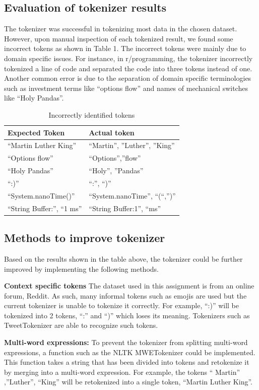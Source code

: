 \documentclass[sigconf,nonacm=true]{acmart}
\begin{document}
\subsection{Evaluation of tokenizer results}
The tokenizer was successful in tokenizing most data in the chosen dataset. However, upon manual inspection of each tokenized result, we found some incorrect tokens as shown in Table 1. The incorrect tokens were mainly due to domain specific issues. For instance, in r/programming, the tokenizer incorrectly tokenized a line of code and separated the code into three tokens instead of one. Another common error is due to the separation of domain specific terminologies such as investment terms like “options flow” and names of mechanical switches like “Holy Pandas”.

\begin{table}[h]
\begin{tabular}{|l|l|}
\hline
 {\bf Expected Token} &  {\bf Actual token} \\ \hline
 “Martin Luther King”& “Martin”, ”Luther”, ”King”  \\ \hline
 “Options flow” &  “Options”,”flow” \\ \hline
 “Holy Pandas”& “Holy”, ”Pandas” \\ \hline
“:)” &  “:”, “)”\\ \hline
 “System.nanoTime()”& “System.nanoTime”, “(“,”)” \\ \hline
“String Buffer:”, “1 ms”  &  “String Buffer:1”, “ms”\\ \hline
\end{tabular}
\caption{\label{tab:Table 1:}Incorrectly identified tokens}
\end{table}


\subsection{Methods to improve tokenizer}
Based on the results shown in the table above, the tokenizer could be further improved by implementing the following methods. \medskip


{\bf Context specific tokens}
The dataset used in this assignment is from an online forum, Reddit. As such, many informal tokens such as emojis are used but the current tokenizer is unable to tokenize it correctly. For example, “:)” will be tokenized into 2 tokens, “:” and “)” which loses its meaning. Tokenizers such as TweetTokenizer are able to recognize such tokens.\bigskip

 {\bf Multi-word expressions:}
To prevent the tokenizer from splitting multi-word expressions, a function such as the NLTK MWETokenizer could be implemented. This function takes a string that has been divided into tokens and re\-tokenize it by merging into a multi-word expression. For example, the tokens “ Martin” ,”Luther”, “King” will be re\-tokenized into a single token, “Martin Luther King”. \smallskip
\end{document}

